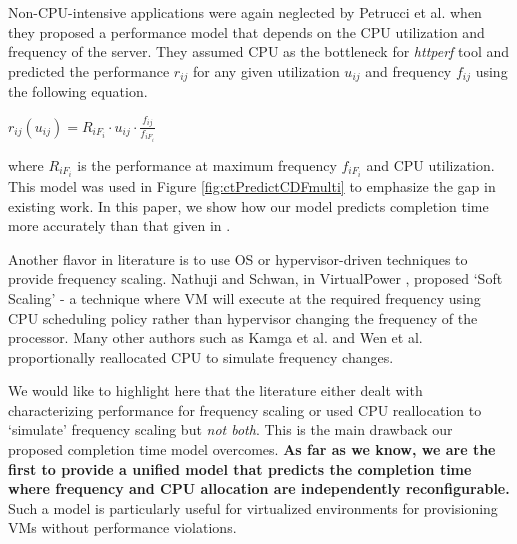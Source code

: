 \documentclass{sig-alternate}
\begin{document}
Non-CPU-intensive applications were again neglected by Petrucci et al. \cite{Petrucci2011} when they proposed a performance model that depends on the CPU utilization and frequency of the server. They assumed CPU as the bottleneck for \emph{httperf} tool and predicted the performance $r_{ij}$ for any given utilization $u_{ij}$ and frequency $f_{ij}$ using the following equation. 

\begin{center}$r_{ij} (u_{ij} ) = R_{iF_i} \cdot u_{ij} \cdot \frac{f_{ij}}{f_{iF_i}}$\end{center}

where $R_{iF_i}$ is the performance at maximum frequency $f_{iF_i}$ and CPU utilization. This model was used in Figure \ref{fig:ctPredictCDFmulti} to emphasize the gap in existing work. In this paper, we show how our model predicts completion time more accurately than that given in \cite{Petrucci2011}. 

Another flavor in literature is to use OS or hypervisor-driven techniques to provide frequency scaling. Nathuji and Schwan, in VirtualPower \cite{Nathuji2007}, proposed `Soft Scaling' - a technique where VM will execute at the required frequency using CPU scheduling policy rather than hypervisor changing the frequency of the processor. Many other authors such as Kamga et al. \cite{Kamga2011} and Wen et al. \cite{Wen2010} proportionally reallocated CPU to simulate frequency changes. 

We would like to highlight here that the literature either dealt with characterizing performance for frequency scaling or used CPU reallocation to `simulate' frequency scaling but \emph{not both}. This is the main drawback our proposed completion time model overcomes. \textbf{As far as we know, we are the first to provide a unified model that predicts the completion time where frequency and CPU allocation are independently reconfigurable.} Such a model is particularly useful for virtualized environments for provisioning VMs without performance violations.
\end{document}

